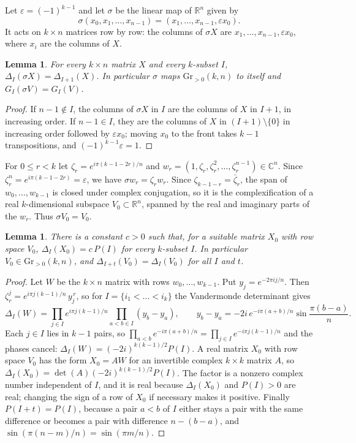 \documentclass[11pt]{article}
\newtheorem{lemma}[theorem]{Lemma}
\theoremstyle{remark}
\newcommand{\Gr}{\mathrm{Gr}}
\newcommand{\R}{\mathbb{R}}
\begin{document}
Let $\varepsilon=(-1)^{k-1}$ and let $\sigma$ be the linear map of $\R^n$ given by
\[
\sigma(x_0,x_1,\dots,x_{n-1})=(x_1,\dots,x_{n-1},\varepsilon x_0).
\]
It acts on $k\times n$ matrices row by row: the columns of $\sigma X$ are $x_1,\dots,x_{n-1},\varepsilon x_0$, where $x_i$ are the columns of $X$.

\begin{lemma}\label{lem:shift}
For every $k\times n$ matrix $X$ and every $k$-subset $I$, $\Delta_I(\sigma X)=\Delta_{I+1}(X)$. In particular $\sigma$ maps $\Gr_{>0}(k,n)$ to itself and $G_I(\sigma V)=G_I(V)$.
\end{lemma}

\begin{proof}
If $n-1\notin I$, the columns of $\sigma X$ in $I$ are the columns of $X$ in $I+1$, in increasing order. If $n-1\in I$, they are the columns of $X$ in $(I+1)\setminus\{0\}$ in increasing order followed by $\varepsilon x_0$; moving $x_0$ to the front takes $k-1$ transpositions, and $(-1)^{k-1}\varepsilon=1$.
\end{proof}

For $0\le r<k$ let $\zeta_r=e^{i\pi(k-1-2r)/n}$ and $w_r=(1,\zeta_r,\zeta_r^2,\dots,\zeta_r^{n-1})\in\mathbb{C}^n$. Since $\zeta_r^n=e^{i\pi(k-1-2r)}=\varepsilon$, we have $\sigma w_r=\zeta_rw_r$. Since $\zeta_{k-1-r}=\bar\zeta_r$, the span of $w_0,\dots,w_{k-1}$ is closed under complex conjugation, so it is the complexification of a real $k$-dimensional subspace $V_0\subset\R^n$, spanned by the real and imaginary parts of the $w_r$. Thus $\sigma V_0=V_0$.

\begin{lemma}\label{lem:V0}
There is a constant $c>0$ such that, for a suitable matrix $X_0$ with row space $V_0$, $\Delta_I(X_0)=c\,P(I)$ for every $k$-subset $I$. In particular $V_0\in\Gr_{>0}(k,n)$, and $\Delta_{I+t}(V_0)=\Delta_I(V_0)$ for all $I$ and $t$.
\end{lemma}

\begin{proof}
Let $W$ be the $k\times n$ matrix with rows $w_0,\dots,w_{k-1}$. Put $y_j=e^{-2\pi ij/n}$. Then $\zeta_r^j=e^{i\pi j(k-1)/n}\,y_j^{\,r}$, so for $I=\{i_1<\dots<i_k\}$ the Vandermonde determinant gives
\[
\Delta_I(W)=\prod_{j\in I}e^{i\pi j(k-1)/n}\prod_{a<b\in I}(y_b-y_a),\qquad
y_b-y_a=-2i\,e^{-i\pi(a+b)/n}\sin\frac{\pi(b-a)}{n}.
\]
Each $j\in I$ lies in $k-1$ pairs, so $\prod_{a<b}e^{-i\pi(a+b)/n}=\prod_{j\in I}e^{-i\pi j(k-1)/n}$ and the phases cancel: $\Delta_I(W)=(-2i)^{k(k-1)/2}P(I)$. A real matrix $X_0$ with row space $V_0$ has the form $X_0=AW$ for an invertible complex $k\times k$ matrix $A$, so $\Delta_I(X_0)=\det(A)(-2i)^{k(k-1)/2}P(I)$. The factor is a nonzero complex number independent of $I$, and it is real because $\Delta_I(X_0)$ and $P(I)>0$ are real; changing the sign of a row of $X_0$ if necessary makes it positive. Finally $P(I+t)=P(I)$, because a pair $a<b$ of $I$ either stays a pair with the same difference or becomes a pair with difference $n-(b-a)$, and $\sin(\pi(n-m)/n)=\sin(\pi m/n)$.
\end{proof}
\end{document}
